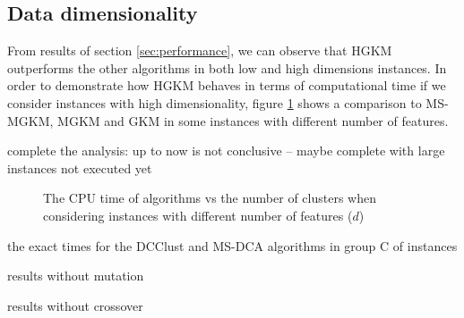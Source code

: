\subsection{Data dimensionality}
From results of section \ref{sec:performance}, we can observe that HGKM outperforms the other algorithms in both low and high dimensions instances. In order to demonstrate how HGKM behaves in terms of computational time if we consider instances with high dimensionality, figure \ref{fig:dimen} shows a comparison to MS-MGKM, MGKM and GKM in some instances with different number of features.

\noindent [TO-DO] complete the analysis: up to now is not conclusive -- maybe complete with large instances not executed yet

\begin{figure}[H]
\centering
{}
\caption{The CPU time of algorithms vs the number of clusters when considering instances with different number of features ($d$)}
\label{fig:dimen}
\end{figure}

\noindent [TO-DO] the exact times for the DCClust and MS-DCA algorithms in group C of instances


\noindent [TO-DO] results without mutation

\noindent [TO-DO] results without crossover